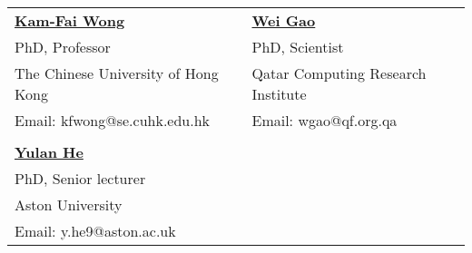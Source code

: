 \documentclass[9.5pt]{article}
\begin{document}
\begin{tabular}{ll}
\href{http://www.cintec.cuhk.edu.hk/kfwong/}{\textbf{Kam-Fai Wong}} & \href{http://www.qcri.com/our-people/bio?pid=44&par=acc&name=WeiGao}{\textbf{Wei Gao}}\\
PhD, Professor & PhD, Scientist\\
The Chinese University of Hong Kong & Qatar Computing Research Institute\\
Email: kfwong@se.cuhk.edu.hk & Email: wgao@qf.org.qa\\
\\

\href{http://www1.aston.ac.uk/eas/staff/dr-yulan-he/} {\textbf{Yulan He}} & \\
PhD, Senior lecturer & \\
Aston University & \\
Email: y.he9@aston.ac.uk &\\

\end{tabular}
\end{document}
